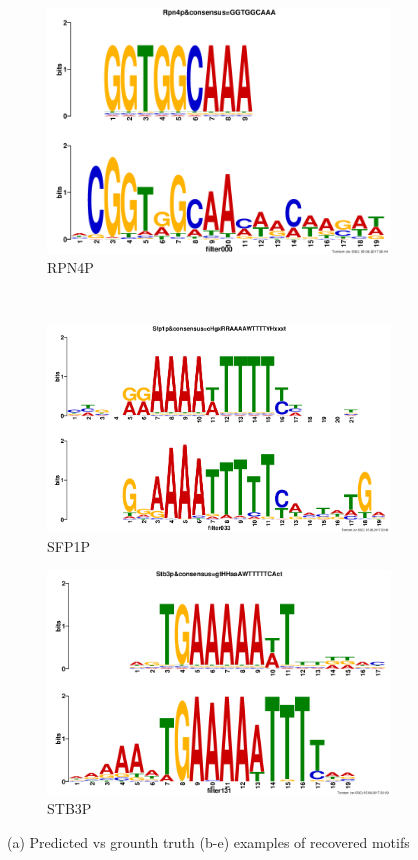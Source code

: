 \documentclass{article}
\begin{document}
\begin{figure}[h]
{\begin{subfigure}{.475\linewidth}
            \includegraphics[width=\textwidth]{fig/tomtom/rpn4p.png}
            \caption{RPN4P}
    \end{subfigure}\\
    \begin{subfigure}{.475\linewidth}
            \includegraphics[width=\textwidth]{fig/tomtom/sfp1p_2.png}
            \caption{SFP1P}
    \end{subfigure}
    \begin{subfigure}{.475\linewidth}
            \includegraphics[width=\textwidth]{fig/tomtom/stb3p.png}
            \caption{STB3P}
    \end{subfigure}
    }
    \caption{(a) Predicted vs grounth truth (b-e) examples of recovered motifs}\label{fig:1}
\end{figure}
\end{document}
